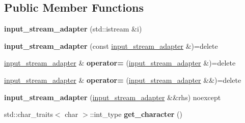 \subsection*{Public Member Functions}
\begin{DoxyCompactItemize}
\item 
\mbox{\label{classnlohmann_1_1detail_1_1input__stream__adapter_af487152e4606d013eb4ec6a90eaf82ea}} 
{\bfseries input\+\_\+stream\+\_\+adapter} (std\+::istream \&i)
\item 
\mbox{\label{classnlohmann_1_1detail_1_1input__stream__adapter_a5190fe4d0c5ff2e3b348b28ee3bb2218}} 
{\bfseries input\+\_\+stream\+\_\+adapter} (const \hyperlink{classnlohmann_1_1detail_1_1input__stream__adapter}{input\+\_\+stream\+\_\+adapter} \&)=delete
\item 
\mbox{\label{classnlohmann_1_1detail_1_1input__stream__adapter_aeac5048221929b8f7558d1698dd0fb3a}} 
\hyperlink{classnlohmann_1_1detail_1_1input__stream__adapter}{input\+\_\+stream\+\_\+adapter} \& {\bfseries operator=} (\hyperlink{classnlohmann_1_1detail_1_1input__stream__adapter}{input\+\_\+stream\+\_\+adapter} \&)=delete
\item 
\mbox{\label{classnlohmann_1_1detail_1_1input__stream__adapter_a3577dff99cc91968557b52959b0363e4}} 
\hyperlink{classnlohmann_1_1detail_1_1input__stream__adapter}{input\+\_\+stream\+\_\+adapter} \& {\bfseries operator=} (\hyperlink{classnlohmann_1_1detail_1_1input__stream__adapter}{input\+\_\+stream\+\_\+adapter} \&\&)=delete
\item 
\mbox{\label{classnlohmann_1_1detail_1_1input__stream__adapter_a0be44ef098e88e8453eb4c31c9b14421}} 
{\bfseries input\+\_\+stream\+\_\+adapter} (\hyperlink{classnlohmann_1_1detail_1_1input__stream__adapter}{input\+\_\+stream\+\_\+adapter} \&\&rhs) noexcept
\item 
\mbox{\label{classnlohmann_1_1detail_1_1input__stream__adapter_ac6c760c5df3a85b5800b4271c09e8671}} 
std\+::char\+\_\+traits$<$ char $>$\+::int\+\_\+type {\bfseries get\+\_\+character} ()
\end{DoxyCompactItemize}



